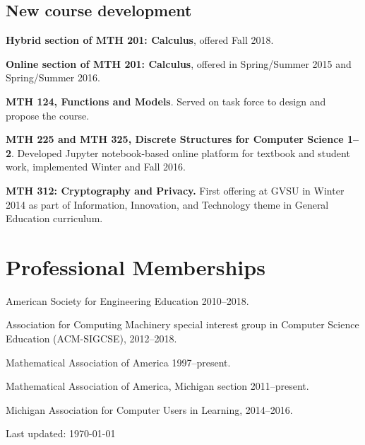 \documentclass[letterpaper]{article}
\def\footerlink{}
\renewenvironment{itemize}{
  \begin{list}{}{
    \setlength{\leftmargin}{1.5em}
	\setlength{\itemsep}{0in}
  }
}{
  \end{list}
}
\begin{document}
\subsection*{New course development}
\begin{itemize}
	\item \textbf{Hybrid section of MTH 201: Calculus}, offered Fall 2018. 
	\item \textbf{Online section of MTH 201: Calculus}, offered in Spring/Summer 2015 and Spring/Summer 2016.
	\item \textbf{MTH 124, Functions and Models}. Served on task force to design and propose the course.
	\item \textbf{MTH 225 and MTH 325, Discrete Structures for Computer Science 1--2}. Developed Jupyter notebook-based online platform for textbook and student work, implemented Winter and Fall 2016.
	\item \textbf{MTH 312: Cryptography and Privacy. }First offering at GVSU in Winter 2014 as part of Information, Innovation, and Technology theme in General Education curriculum.
\end{itemize}


\section*{Professional Memberships}
\begin{itemize}
	\item American Society for Engineering Education 2010--2018.
	\item Association for Computing Machinery special interest group in Computer Science Education (ACM-SIGCSE), 2012--2018.
	\item Mathematical Association of America 1997--present.
	\item Mathematical Association of America, Michigan section 2011--present.
	\item Michigan Association for Computer Users in Learning, 2014--2016.
\end{itemize}


\bigskip

\begin{center}
  \begin{footnotesize}
    Last updated: \today \\
  \end{footnotesize}
\end{center}
\end{document}
